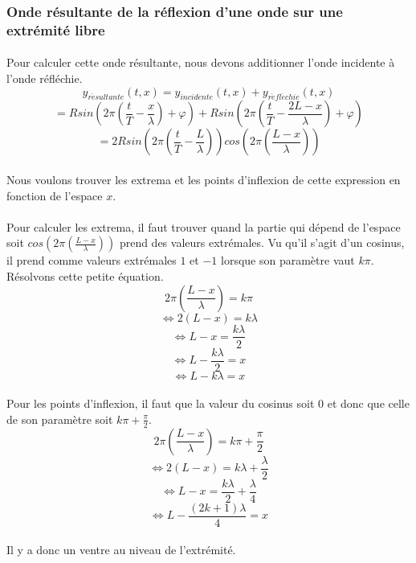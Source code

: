 \documentclass[a4paper]{article}
\begin{document}
\subsubsection{Onde résultante de la réflexion d'une onde sur une extrémité libre}
\paragraph{}Pour calculer cette onde résultante, nous devons additionner l'onde incidente à l'onde réfléchie.
\[y_{r\acute{e}sultante}(t,x)=y_{incidente}(t,x)+y_{r\acute{e}fl\acute{e}chie}(t,x)\]
\[=Rsin\left(2\pi \left(\frac{t}{T}-\frac{x}{\lambda}\right)+\varphi\right)+Rsin\left(2\pi \left(\frac{t}{T}-\frac{2L-x}{\lambda}\right)+\varphi\right)\]
\[=2Rsin\left(2\pi \left(\frac{t}{T}-\frac{L}{\lambda}\right)\right)cos\left(2\pi \left(\frac{L-x}{\lambda}\right)\right)\]
\paragraph{}Nous voulons trouver les extrema et les points d'inflexion de cette expression en fonction de l'espace $x$.
\paragraph{}Pour calculer les extrema, il faut trouver quand la partie qui dépend de l'espace soit $cos\left(2\pi \left(\frac{L-x}{\lambda}\right)\right)$ prend des valeurs extrémales. Vu qu'il s'agit d'un cosinus, il prend comme valeurs extrémales $1$ et $-1$ lorsque son paramètre vaut $k\pi$. Résolvons cette petite équation.
\[2\pi\left(\frac{L-x}{\lambda}\right)=k\pi\]
\[\Leftrightarrow 2\left(L-x\right)=k\lambda\]
\[\Leftrightarrow L-x=\frac{k\lambda}{2}\]
\[\Leftrightarrow L-\frac{k\lambda}{2}=x\]
\[\Leftrightarrow L-k\lambda=x\]
\paragraph{}Pour les points d'inflexion, il faut que la valeur du cosinus soit $0$ et donc que celle de son paramètre soit $k\pi+\frac{\pi}{2}$.
\[2\pi\left(\frac{L-x}{\lambda}\right)=k\pi+\frac{\pi}{2}\]
\[\Leftrightarrow 2\left(L-x\right)=k\lambda+\frac{\lambda}{2}\]
\[\Leftrightarrow L-x=\frac{k\lambda}{2}+\frac{\lambda}{4}\]
\[\Leftrightarrow L-\frac{(2k+1)\lambda}{4}=x\]
\paragraph{}Il y a donc un ventre au niveau de l'extrémité.
\end{document}
